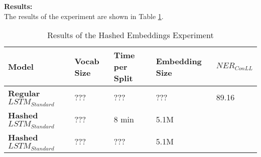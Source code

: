 \documentclass[11pt]{article}
\begin{document}
\textbf{Results:}\\
The results of the experiment are shown in Table \ref{tab:hashed-embeddings-results}. 

\begin{table}[h]
\centering
\begin{tabular}{|l|l|l|l|l|}
\hline
\textbf{Model} & \textbf{Vocab Size} & \textbf{Time per Split} & \textbf{Embedding Size} & \textbf{$NER_{ConLL}$} \\ \hline
\textbf{Regular $LSTM_{Standard}$} & ??? & ???   & ???    & 89.16 \\ \hline
\textbf{Hashed $LSTM_{Standard}$}  & ??? & 8 min & 5.1M   & \\ \hline
\textbf{Hashed $LSTM_{Standard}$}  & ??? & ???   & 5.1M   & \\ \hline
\end{tabular}
\caption{Results of the Hashed Embeddings Experiment}
\label{tab:hashed-embeddings-results}
\end{table}




\end{document}
